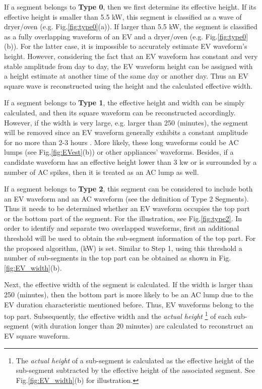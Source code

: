 \documentclass[conference]{IEEEtran}
\begin{document}
If a segment belongs to \textbf{Type 0}, then we first determine its effective height. If its effective height is smaller than 5.5 kW, this segment is classified as a wave of dryer/oven (e.g. Fig.\ref{fig:type0}(a)). If larger than 5.5 kW,  the segment is classified as a fully overlapping waveform of an EV and a dryer/oven (e.g. Fig.\ref{fig:type0}(b)). For the latter case, it is impossible to accurately estimate EV waveform's height. However, considering the fact that an EV waveform has  constant and very stable amplitude from day to day, the EV waveform height can be assigned with a height estimate at another time of the same day or another day. Thus an EV square wave is reconstructed using the height and the calculated effective width.


If a segment belongs to \textbf{Type 1}, the effective height and width can be simply calculated, and then its square waveform can be reconstructed accordingly. However, if the width is very large, e.g. larger than 250 (minutes), the segment will be removed since an EV waveform generally exhibits a constant amplitude for no more than 2-3 hours \cite{PecanReportEV}. More likely, these long waveforms could be AC lumps (see Fig.\ref{fig:EVest}(b)) or other appliances' waveforms. Besides, if a candidate waveform has an effective height lower than 3 kw or is surrounded by a number of AC spikes, then it is treated as an AC lump as well.




If a segment belongs to \textbf{Type 2}, this segment can be considered to include both an EV waveform and an AC waveform (see the definition of Type 2 Segments). Thus it needs to be determined whether an EV waveform occupies the top part or the bottom part of the segment. For the illustration, see Fig.\ref{fig:type2}. In order to identify and separate two overlapped waveforms, first an additional threshold   will be used to obtain the sub-segment information of the top part. For the proposed algorithm, (kW) is set. Similar to Step 1, using this threshold a number of sub-segments in the top part can be obtained as shown in Fig.\ref{fig:EV_width}(b).



Next, the effective width of the segment is calculated. If the width is larger than 250 (minutes), then the bottom part is more likely to be an AC lump due to the EV duration characteristic mentioned before. Thus, EV waveforms belong to the top part. Subsequently, the effective width and the \emph{actual height} \footnote{The \emph{actual height} of a sub-segment is calculated as the effective height of the sub-segment subtracted by the effective height of the associated segment. See Fig.\ref{fig:EV_width}(b) for illustration.} of each sub-segment (with duration longer than 20 minutes) are calculated to reconstruct an EV square waveform.
\end{document}
